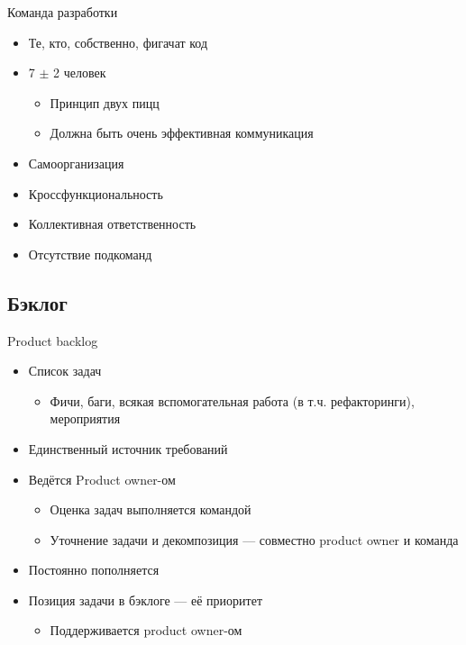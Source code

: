 \documentclass{../../slides-style}
\begin{document}
    \begin{frame}{Команда разработки}
        \begin{itemize}
            \item Те, кто, собственно, фигачат код
            \item 7 $\pm$ 2 человек
            \begin{itemize}
                \item Принцип двух пицц
                \item Должна быть очень эффективная коммуникация
            \end{itemize}
            \item Самоорганизация
            \item Кроссфункциональность
            \item Коллективная ответственность
            \item Отсутствие подкоманд
        \end{itemize}
    \end{frame}

    \subsection{Бэклог}

    \begin{frame}{Product backlog}
        \begin{itemize}
            \item Список задач
            \begin{itemize}
                \item Фичи, баги, всякая вспомогательная работа (в т.ч. рефакторинги), мероприятия
            \end{itemize}
            \item Единственный источник требований
            \item Ведётся Product owner-ом
            \begin{itemize}
                \item Оценка задач выполняется командой
                \item Уточнение задачи и декомпозиция --- совместно product owner и команда
            \end{itemize}
            \item Постоянно пополняется
            \item Позиция задачи в бэклоге --- её приоритет
            \begin{itemize}
                \item Поддерживается product owner-ом
            \end{itemize}
        \end{itemize}
    \end{frame}
\end{document}
